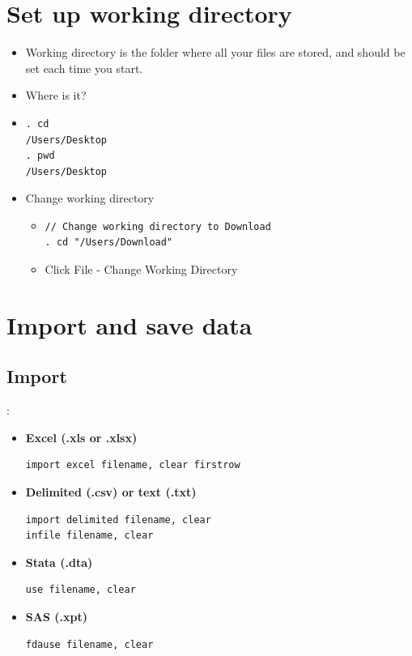 \section{Set up working directory}
\begin{frame}[fragile]{\secname}
\begin{itemize}
 \item	Working directory is the folder where all your files are stored, and should be set each time you start.
 \item Where is it?
 \item[] \begin{verbatim}
. cd
/Users/Desktop
. pwd
/Users/Desktop
\end{verbatim}
 \item Change working directory
 	\begin{itemize}
  	\item \begin{verbatim}
// Change working directory to Download
. cd "/Users/Download"
\end{verbatim}
  \item Click File - Change Working Directory
\end{itemize}
\end{itemize}
\end{frame}

\section{Import and save data}
\subsection{Import}
\begin{frame}[fragile]{\secname: \subsecname}
\begin{itemize}
	\item \textbf{Excel (.xls or .xlsx)} \begin{verbatim}import excel filename, clear firstrow \end{verbatim}
	\item \textbf{Delimited (.csv) or text (.txt)} 
		\begin{verbatim}import delimited filename, clear
infile filename, clear\end{verbatim}
	\item \textbf{Stata (.dta)} \begin{verbatim}use filename, clear \end{verbatim}
	\item \textbf{SAS (.xpt)} \begin{verbatim}fdause filename, clear \end{verbatim}
\end{itemize}
\end{frame}

